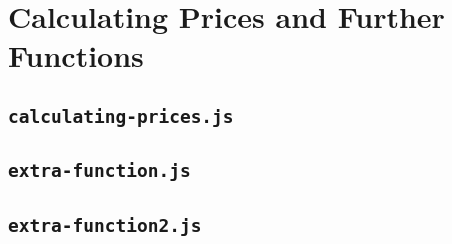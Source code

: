 \section{Calculating Prices and Further Functions}

\subsection{\texttt{calculating-prices.js}}
 

\subsection{\texttt{extra-function.js}}
 

\subsection{\texttt{extra-function2.js}}
 